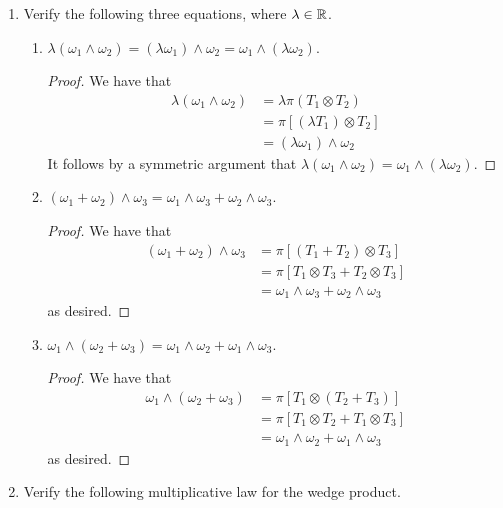 \documentclass[../psets.tex]{subfiles}
\begin{document}
\begin{enumerate}[label={\textbf{1.6.\roman*.}}]
    \item Verify the following three equations, where $\lambda\in\mathbb{R}$.
    \begin{enumerate}
        \item $\lambda(\omega_1\wedge\omega_2)=(\lambda\omega_1)\wedge\omega_2=\omega_1\wedge(\lambda\omega_2)$.
        \begin{proof}
            We have that
            \begin{align*}
                \lambda(\omega_1\wedge\omega_2) &= \lambda\pi(T_1\otimes T_2)\\
                &= \pi[(\lambda T_1)\otimes T_2]\\
                &= (\lambda\omega_1)\wedge\omega_2
            \end{align*}
            It follows by a symmetric argument that $\lambda(\omega_1\wedge\omega_2)=\omega_1\wedge(\lambda\omega_2)$.
        \end{proof}
        \item $(\omega_1+\omega_2)\wedge\omega_3=\omega_1\wedge\omega_3+\omega_2\wedge\omega_3$.
        \begin{proof}
            We have that
            \begin{align*}
                (\omega_1+\omega_2)\wedge\omega_3 &= \pi[(T_1+T_2)\otimes T_3]\\
                &= \pi[T_1\otimes T_3+T_2\otimes T_3]\\
                &= \omega_1\wedge\omega_3+\omega_2\wedge\omega_3
            \end{align*}
            as desired.
        \end{proof}
        \item $\omega_1\wedge(\omega_2+\omega_3)=\omega_1\wedge\omega_2+\omega_1\wedge\omega_3$.
        \begin{proof}
            We have that
            \begin{align*}
                \omega_1\wedge(\omega_2+\omega_3) &= \pi[T_1\otimes(T_2+T_3)]\\
                &= \pi[T_1\otimes T_2+T_1\otimes T_3]\\
                &= \omega_1\wedge\omega_2+\omega_1\wedge\omega_3
            \end{align*}
            as desired.
        \end{proof}
    \end{enumerate}
    \item Verify the following multiplicative law for the wedge product.

\end{enumerate}
\end{document}

